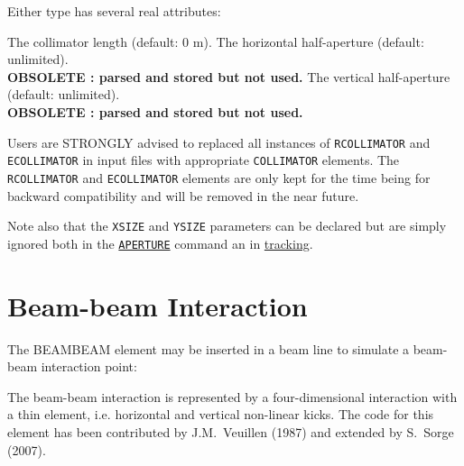 
Either type has several real attributes: 
\begin{madlist}
   The collimator length (default: 0 m). 
   The horizontal half-aperture (default: unlimited). \\
  \textbf{OBSOLETE : parsed and stored but not used.} 
   The vertical half-aperture (default: unlimited). \\
  \textbf{OBSOLETE : parsed and stored but not used.} 
\end{madlist}

Users are STRONGLY advised to replaced all instances of \texttt{RCOLLIMATOR} 
and \texttt{ECOLLIMATOR} in input files with appropriate \texttt{COLLIMATOR} 
elements. The \texttt{RCOLLIMATOR} and \texttt{ECOLLIMATOR} elements are only
kept for the time being for backward compatibility and will be removed in 
the near future. 

Note also that the \texttt{XSIZE} and \texttt{YSIZE} parameters can be declared 
but are simply ignored both in the \hyperref[chap:aperture]{\texttt{APERTURE}}
command an in \hyperref[chap:thintrack]{tracking}.


\section{Beam-beam Interaction}
The BEAMBEAM element may be inserted in a beam line to simulate a
beam-beam interaction point:  
 

The beam-beam interaction is represented by a four-dimensional
interaction with a thin element, i.e. horizontal and vertical non-linear kicks.
The code for this element has been contributed by J.M.~Veuillen (1987)
and extended by S.~Sorge (2007).  
 
